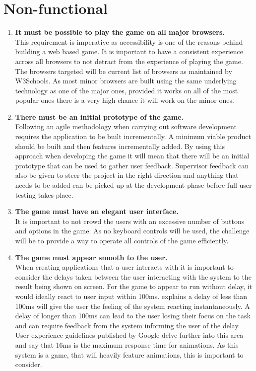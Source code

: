\documentclass[12pt,a4paper]{report}
\begin{document}
         \section{Non-functional}
   \begin{enumerate}[label*=\arabic*]
            \item \textbf{It must be possible to play the game on all major browsers.}\\
            This requirement is imperative as accessibility is one of the reasons behind building a web based game. It is important to have a consistent experience across all browsers to not detract from the experience of playing the game. The browsers targeted will be current list of browsers as maintained by W3Schools. As most minor browsers are built using the same underlying technology as one of the major ones, provided it works on all of the most popular ones there is a very high chance it will work on the minor ones.    
            
            
             \item \textbf{There must be an initial prototype of the game.
}\\
            Following an agile methodology when carrying out software development requires the application to be built incrementally. A minimum viable product should be built and then features incrementally added. By using this approach when developing the game it will mean that there will be an initial prototype that can be used to gather user feedback. Supervisor feedback can also be given to steer the project in the right direction and anything that needs to be added can be picked up at the development phase before full user testing takes place.
            
            
                         \item \textbf{The game must have an elegant user interface.}\\
It is important to not crowd the users with an excessive number of buttons and options in the game. As no keyboard controls will be used, the challenge will be to provide a way to operate all controls of the game efficiently.
            
                        
                         \item \textbf{The game must appear smooth to the user.}\\
When creating applications that a user interacts with it is important to consider the delays taken between the user interacting with the system to the result being shown on screen. For the game to appear to run without delay, it would ideally react to user input within 100ms. \citep{nielsen1994usability} explains a delay of less than 100ms will give the user the feeling of the system reacting instantaneously. A delay of longer than 100ms can lead to the user losing their focus on the task and can require feedback from the system informing the user of the delay. User experience guidelines published by Google delve further into this area and say that 16ms is the maximum response time for animations. As this system is a game, that will heavily feature animations, this is important to consider.
             

\end{enumerate}
\end{document}

